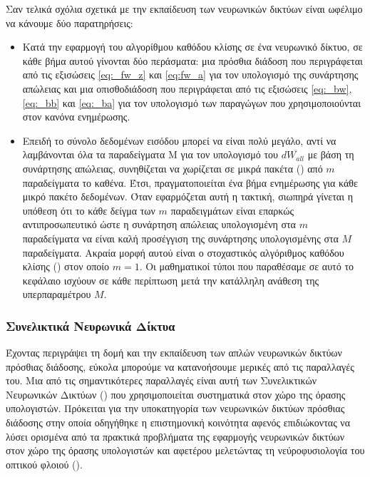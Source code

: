 Σαν τελικά σχόλια σχετικά με την εκπαίδευση των νευρωνικών δικτύων είναι ωφέλιμο να κάνουμε δύο παρατηρήσεις:
\begin{itemize}
  \item Κατά την εφαρμογή του αλγορίθμου καθόδου κλίσης σε ένα νευρωνικό δίκτυο, σε κάθε βήμα αυτού γίνονται δύο περάσματα: μια πρόσθια διάδοση που περιγράφεται από τις εξισώσεις \ref{eq:_fw_z} και \ref{eq:fw_a} για τον υπολογισμό της συνάρτησης απώλειας και μια οπισθοδιάδοση που περιγράφεται από τις εξισώσεις \ref{eq:_bw}, \ref{eq:_bb} και \ref{eq:_ba} για τον υπολογισμό των παραγώγων που χρησιμοποιούνται στον κανόνα ενημέρωσης.
  \item Επειδή το σύνολο δεδομένων εισόδου μπορεί να είναι πολύ μεγάλο, αντί να λαμβάνονται όλα τα παραδείγματα Μ για τον υπολογισμό του $d\overline{W_{all}}$ με βάση τη συνάρτησης απώλειας, συνηθίζεται να χωρίζεται σε μικρά πακέτα () από $m$ παραδείγματα το καθένα. Έτσι, πραγματοποιείται ένα βήμα ενημέρωσης για κάθε μικρό πακέτο δεδομένων. Όταν εφαρμόζεται αυτή η τακτική, σιωπηρά γίνεται η υπόθεση ότι το κάθε δείγμα των $m$ παραδειγμάτων είναι επαρκώς αντιπροσωπευτικό ώστε η συνάρτηση απώλειας υπολογισμένη στα $m$ παραδείγματα να είναι καλή προσέγγιση της συνάρτησης υπολογισμένης στα $M$ παραδείγματα. Ακραία μορφή αυτού είναι ο στοχαστικός αλγόριθμος καθόδου κλίσης () στον οποίο $m=1$. Οι μαθηματικοί τύποι που παραθέσαμε σε αυτό το κεφάλαιο ισχύουν σε κάθε περίπτωση μετά την κατάλληλη ανάθεση της υπερπαραμέτρου $M$.
\end{itemize}

\subsubsection{Συνελικτικά Νευρωνικά Δίκτυα}

Έχοντας περιγράψει τη δομή και την εκπαίδευση των απλών νευρωνικών δικτύων πρόσθιας διάδοσης, εύκολα μπορούμε να κατανοήσουμε μερικές από τις παραλλαγές του. Μια από τις σημαντικότερες παραλλαγές είναι αυτή των Συνελικτικών Νευρωνικών Δικτύων () που χρησιμοποιείται συστηματικά στον χώρο της όρασης υπολογιστών. Πρόκειται για την υποκατηγορία των νευρωνικών δικτύων πρόσθιας διάδοσης στην οποία οδηγήθηκε η επιστημονική κοινότητα αφενός επιδιώκοντας να λύσει ορισμένα από τα πρακτικά προβλήματα της εφαρμογής νευρωνικών δικτύων στον χώρο της όρασης υπολογιστών και αφετέρου μελετώντας τη νεύρο\textendash φυσιολογία του οπτικού φλοιού ().\par

